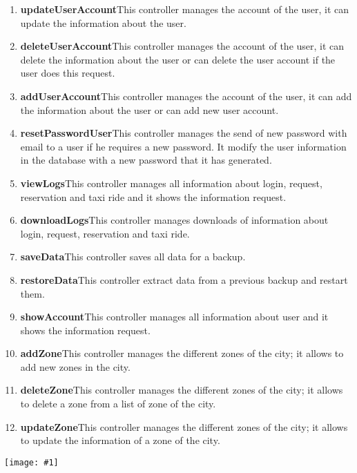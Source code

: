 \documentclass[11pt, a4paper,titlepage]{article}
\newcommand{\image}[1]{
	\begin{center}
		\noindent \texttt{[image: \#1]}
	\end{center}
	}
\begin{document}
\begin{enumerate}
	\begin{enumerate}
		\item \textbf{updateUserAccount}This controller manages the account of the user, it can update 
		the information about the user.
		\item \textbf{deleteUserAccount}This controller manages the account of the user, it can delete 
		the information about the user or can delete the user account if the user does this 
		request.
		\item \textbf{addUserAccount}This controller manages the account of the user, it can add 
		the information about the user or can add new user account.
		\item \textbf{resetPasswordUser}This controller manages the send of new password with email 
		to a user if he requires a new password. It modify the user information in the 
		database with a new password that it has generated.
		\item \textbf{viewLogs}This controller manages all information about login, request, 
		reservation and taxi ride and it shows the information request.
		\item \textbf{downloadLogs}This controller manages downloads of information about login, 
		request, reservation and taxi ride.
		\item \textbf{saveData}This controller saves all data for a backup.
		\item \textbf{restoreData}This controller extract data from a previous backup and restart them.
		\item \textbf{showAccount}This controller manages all information about user and it shows the 
		information request.
		\item \textbf{addZone}This controller manages the different zones of the city; it allows to add 
		new zones in the city.
		\item \textbf{deleteZone}This controller manages the different zones of the city; it allows to 
		delete a zone from a list of zone of the city.
		\item \textbf{updateZone}This controller manages the different zones of the city; it allows to 
		update  the information of a zone of the city.
	\end{enumerate}
\end{enumerate}
\image{BCESystemAdministrator.png}
\newpage
\end{document}
